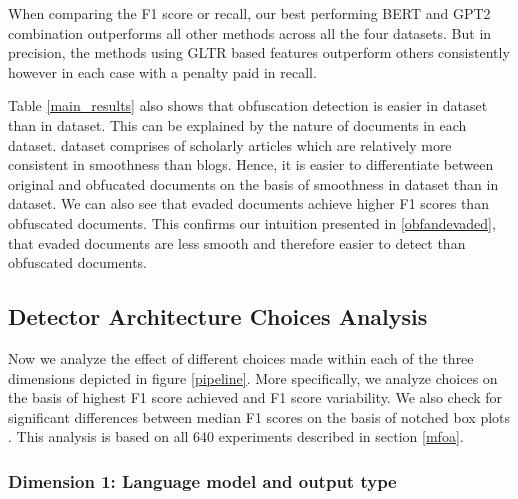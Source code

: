 When comparing the F1 score or recall, our best performing BERT and GPT2 combination outperforms all other methods across all the four datasets.
%
But in precision, the methods using GLTR based features outperform others consistently however in each case with a penalty paid in recall.
%

Table \ref{main_results} also shows that obfuscation detection is easier in \amt dataset than in \blogs dataset.
%
This can be explained by the nature of documents in each dataset. %
\amt dataset comprises of scholarly articles which are relatively more consistent in smoothness than blogs.
%
Hence, it is easier to differentiate between original and obfucated documents on the basis of smoothness in \amt dataset than in \blogs dataset.
%
We can also see that evaded documents achieve higher F1 scores than obfuscated documents.
%
This confirms our intuition presented in \ref{obfandevaded}, that evaded documents are less smooth and therefore easier to detect than obfuscated documents.



%

\subsection{Detector Architecture Choices Analysis}
Now we analyze the effect of different choices made within each of the three dimensions depicted in figure \ref{pipeline}.
%
More specifically, we analyze choices on the basis of highest F1 score achieved and F1 score variability.
%
We also check for significant differences between median F1 scores on the basis of notched box plots \cite{krzywinski2014points}.
%
This analysis is based on all 640 experiments described in section \ref{mfoa}.

\subsubsection{Dimension 1: Language model and output type}


